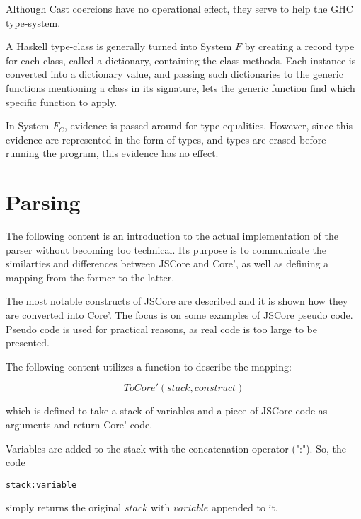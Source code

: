 Although Cast coercions have no operational effect, they serve to help the
GHC type-system.


A Haskell type-class is generally turned into System $F$ by creating a 
record type for each class, called a dictionary, containing the class methods.
Each instance is converted into a dictionary value, and passing such 
dictionaries to the generic functions mentioning a class in its signature,
lets the generic function find which specific function to apply.
\cite{sulzmann2007system}


In System $F_C$, evidence is passed around for type equalities. However,
since this evidence are represented in the form of types, and types are
erased before running the program, this evidence has no effect.
\cite{sulzmann2007system}

\section{Parsing}

The following content is an introduction to the actual implementation
of the parser without becoming too technical. Its purpose is to communicate
the similarties and differences between JSCore 
and Core', as well as defining a mapping from the former to the latter.

The most notable constructs of JSCore are described and it is shown how they
are converted into Core'. The focus is on some examples of JSCore pseudo code.
Pseudo code is used for practical reasons, as real code is too large to be 
presented.

The following content utilizes a function to describe the mapping:

\begin{equation*}
ToCore'(stack, construct)
\end{equation*}

which is defined to take a stack of variables and a piece of JSCore code 
as arguments and return Core' code. 

Variables are added to the stack with the concatenation operator (":"). 
So, the code 
\lstset{ %
language=Haskell,
label=lst:int1
}
\begin{lstlisting}
stack:variable 
\end{lstlisting}
simply returns the original $stack$ with $variable$ appended to it.


